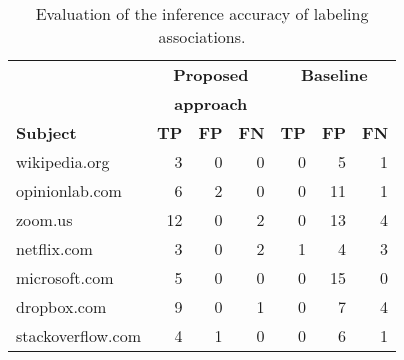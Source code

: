 \renewcommand{\arraystretch}{0.7}
\begin{table}[t]
\caption{Evaluation of the inference accuracy of labeling associations.}
\label{table:rq1}
\centering
\begin{tabularx}{0.85\columnwidth}{p{}rrr|rrr}
\hline
                  & \multicolumn{3}{c|}{\textbf{\small Proposed}}                                      & \multicolumn{3}{c}{\textbf{\small Baseline}}                                          \\
                  & \multicolumn{3}{c|}{\textbf{\small approach}}                                      & \multicolumn{3}{c}{}                                                \\
\hline
\textbf{\small Subject}           & \multicolumn{1}{c}{\textbf{\small TP}} & \multicolumn{1}{c}{\textbf{\small FP}} & \multicolumn{1}{c|}{\textbf{\small FN}} & \multicolumn{1}{c}{\textbf{\small TP}} & \multicolumn{1}{c}{\textbf{\small FP}} & \multicolumn{1}{c}{\textbf{\small FN}}  \\ 
\hline
\small wikipedia.org     & 3                       & 0                       & 0                       & 0                       & 5                       & 1                        \\
\small opinionlab.com    & 6                       & 2                       & 0                       & 0                       & 11                      & 1                        \\
\small zoom.us           & 12                      & 0                       & 2                       & 0                       & 13                      & 4                        \\
\small netflix.com       & 3                       & 0                       & 2                       & 1                       & 4                       & 3                        \\
\small microsoft.com     & 5                       & 0                       & 0                       & 0                       & 15                      & 0                        \\
\small dropbox.com       & 9                       & 0                       & 1                       & 0                       & 7                       & 4                        \\
\small stackoverflow.com & 4                       & 1                       & 0                       & 0                       & 6                       & 1                        \\

\end{tabularx}
\end{table}
